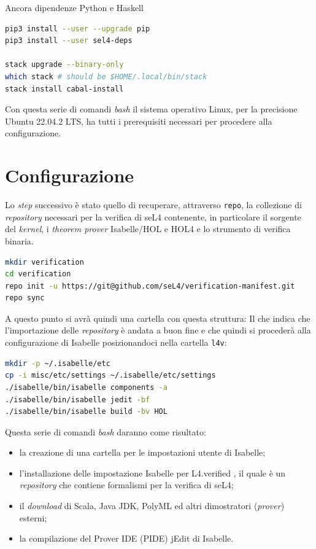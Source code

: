 Ancora dipendenze Python e Haskell
\begin{lstlisting}[language=bash]
pip3 install --user --upgrade pip
pip3 install --user sel4-deps

stack upgrade --binary-only
which stack # should be $HOME/.local/bin/stack
stack install cabal-install
\end{lstlisting}

Con questa serie di comandi \textit{bash} il sistema operativo Linux, per la precisione Ubuntu 22.04.2 LTS, ha tutti i prerequisiti necessari per procedere alla configurazione.

\section{Configurazione}
Lo \textit{step} successivo è stato quello di recuperare, attraverso \texttt{repo}, la collezione di \textit{repository} necessari per la verifica di seL4 contenente, in particolare il sorgente del \textit{kernel}, i \textit{theorem prover} Isabelle/HOL e HOL4 e lo strumento di verifica binaria.
\begin{lstlisting}[language=bash]
mkdir verification
cd verification
repo init -u https://git@github.com/seL4/verification-manifest.git
repo sync
\end{lstlisting}

A questo punto si avrà quindi una cartella con questa struttura:
Il che indica che l'importazione delle \textit{repository} è andata a buon fine e che quindi si procederà alla configurazione di Isabelle posizionandoci nella cartella \texttt{l4v}:
\begin{lstlisting}[language=bash]
mkdir -p ~/.isabelle/etc
cp -i misc/etc/settings ~/.isabelle/etc/settings
./isabelle/bin/isabelle components -a
./isabelle/bin/isabelle jedit -bf
./isabelle/bin/isabelle build -bv HOL
\end{lstlisting}

Questa serie di comandi \textit{bash} daranno come risultato:
\begin{itemize}
	\item la creazione di una cartella per le impostazioni utente di Isabelle;
	\item l'installazione delle impostazione Isabelle per L4.verified \cite{l4v}, il quale è un \textit{repository} che contiene formalismi per la verifica di seL4;
	\item il \textit{download} di Scala, Java JDK, PolyML ed altri dimostratori (\textit{prover}) esterni;
	\item la compilazione del Prover IDE (PIDE) jEdit di Isabelle.
\end{itemize} 

